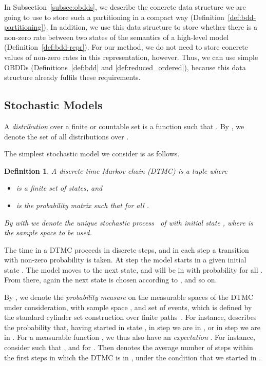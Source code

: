 \documentclass[10pt,twocolumn]{article}
\newtheorem{definition}{Definition}
\begin{document}
In Subsection~\ref{subsec:obdds}, we describe the concrete data structure we are going to use to store such a partitioning in a compact way (Definition~\ref{def:bdd-partitioning}).
In addition, we use this data structure to store whether there is a non-zero rate between two states of the semantics of a high-level model (Definition~\ref{def:bdd-repr}).
For our method, we do not need to store concrete values of non-zero rates in this representation, however.
Thus, we can use simple OBDDs (Definitions~\ref{def:bdd} and \ref{def:reduced_ordered}), because this data structure already fulfils these requirements.



\subsection{Stochastic Models}
\label{subsec:stochastic_models}

\noindent A \emph{distribution} over a finite or countable set  is a function  such that . By , we
denote the set of all distributions over . 

The simplest stochastic model we consider is as follows.
\begin{definition}
  \label{def:dtmc}
A \emph{discrete-time Markov chain (DTMC)} is a tuple  where
\begin{itemize}
  \item  is a finite set of \emph{states}, and
  \item  is the \emph{probability matrix} such that  for all .
  \end{itemize}
By  with  we denote the unique stochastic process~\cite{Stewart94} of  with initial state , where  is the sample space to be used.
\end{definition}
The time in a DTMC proceeds in discrete steps, and in each step a transition with non-zero probability is taken.
At step  the model starts in a given initial state .
The model moves to the next state, and will be in  with probability  for all .
From there, again the next state is chosen according to , and so on.

By , we denote the \emph{probability measure} on the measurable spaces  
of the DTMC  under consideration, with sample space , and set  of events,
which is defined by the standard cylinder set construction over finite paths~\cite{KSK66}.
For instance, 
describes the probability that, having started in state , in step  we are in , or in step  we are in .
For a measurable function , we thus also have an \emph{expectation} .
For instance, consider  such that , and  for .
Then  denotes the average number of steps within the first  steps in which the DTMC is in , under the condition that we started in .
\end{document}
